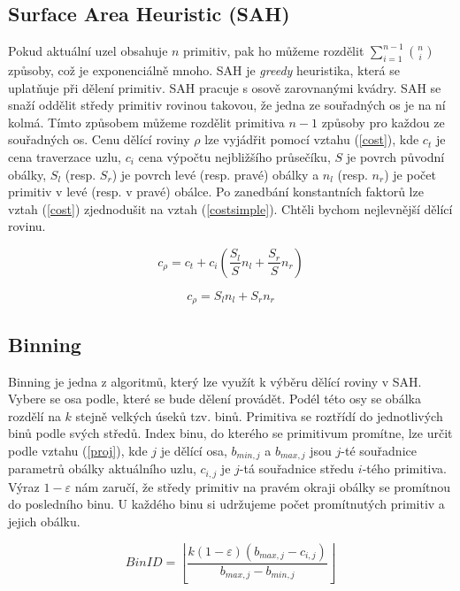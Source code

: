 \documentclass[11pt]{article}
\begin{document}
\subsection{Surface Area Heuristic (SAH)}
Pokud aktuální uzel obsahuje $n$ primitiv, pak ho můžeme rozdělit $\sum_{i = 1}^{n - 1} {n\choose i}$ způsoby, což je exponenciálně mnoho. SAH je \emph{greedy} heuristika, která se uplatňuje při dělení primitiv. SAH pracuje s osově zarovnanými kvádry. SAH se snaží oddělit středy primitiv rovinou takovou, že jedna ze souřadných os je na ní kolmá. Tímto způsobem můžeme rozdělit primitiva $n - 1$ způsoby pro každou ze souřadných os. Cenu dělící roviny $\rho$ lze vyjádřit pomocí vztahu (\ref{cost}), kde $c_t$ je cena traverzace uzlu, $c_i$ cena výpočtu nejbližšího průsečíku,  $S$ je povrch původní obálky, $S_l$ (resp. $S_r$) je povrch levé (resp. pravé) obálky a $n_l$ (resp. $n_r$) je počet primitiv v levé (resp. v pravé) obálce. Po zanedbání konstantních faktorů lze vztah (\ref{cost}) zjednodušit na vztah (\ref{costsimple}). Chtěli bychom nejlevnější dělící rovinu.

\begin{equation}
c_\rho = c_t + c_i\left(\frac{S_l}{S}n_l +\frac{S_r}{S}n_r\right)
\label{cost}
\end{equation}

\begin{equation}
c_\rho = S_l n_l +S_r n_r
\label{costsimple}
\end{equation}

\subsection{Binning}
Binning je jedna z algoritmů, který lze využít k výběru dělící roviny v SAH. Vybere se osa podle, které se bude dělení provádět. Podél této osy se obálka rozdělí na $k$ stejně velkých úseků tzv. binů. Primitiva se roztřídí do jednotlivých binů podle svých středů. Index binu, do kterého se primitivum promítne, lze určit podle vztahu (\ref{proj}), kde $j$ je dělící osa, $b_{min,j}$ a $b_{max,j}$ jsou $j$-té souřadnice parametrů obálky aktuálního uzlu, $c_{i,j}$ je $j$-tá souřadnice středu $i$-tého primitiva. Výraz $1 - \varepsilon$ nám zaručí, že středy primitiv na pravém okraji obálky se promítnou do posledního binu. U každého binu si udržujeme počet promítnutých primitiv a jejich obálku.

\begin{equation}
BinID = \left\lfloor{\frac{ k (1 - \varepsilon) (b_{max, j} - c_{i, j})}{b_{max, j} - b_{min, j}}}\right\rfloor
\label{proj}
\end{equation}
\end{document}
